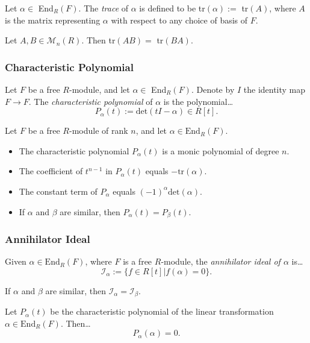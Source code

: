 \noindent Let $\alpha \in$ End$_R(F)$. The \emph{trace} of $\alpha$ is defined to be tr$(\alpha) :=$ tr$(A)$, where
$A$ is the matrix representing $\alpha$ with respect to any choice of basis of $F$.

\begin{lemma}
Let $A,B \in \mathcal{M}_n(R)$. Then tr$(AB) =$ tr$(BA)$.
\end{lemma}

\subsubsection{Characteristic Polynomial}\label{characteristicpolynomial}
Let $F$ be a free $R$-module, and let $\alpha \in$ End$_R(F)$. Denote by $I$ the identity map $F \rightarrow F$. The
\emph{characteristic polynomial} of $\alpha$ is the polynomial\dots
$$P_{\alpha}(t) := \textrm{det}(tI - \alpha) \in R[t].$$

\begin{proposition}
Let $F$ be a free $R$-module of rank $n$, and let $\alpha \in \textrm{End}_R(F)$.
\begin{itemize}
  \item The characteristic polynomial $P_{\alpha}(t)$ is a monic polynomial of degree $n$.
  \item The coefficient of $t^{n-1}$ in $P_{\alpha}(t)$ equals $-\textrm{tr}(\alpha)$.
  \item The constant term of $P_{\alpha}$ equals $(-1)^{\alpha}\textrm{det}(\alpha)$.
  \item If $\alpha$ and $\beta$ are similar, then $P_{\alpha}(t) = P_{\beta}(t)$.
\end{itemize}
\end{proposition}

\subsubsection{Annihilator Ideal}\label{annihilatorideal}
Given $\alpha \in \textrm{End}_R(F)$, where $F$ is a free $R$-module, the \emph{annihilator ideal of $\alpha$} is\dots
$$\mathcal{I}_{\alpha} := \{f \in R[t] | f(\alpha) = 0 \}.$$

\begin{lemma}
If $\alpha$ and $\beta$ are similar, then $\mathcal{I}_{\alpha} = \mathcal{I}_{\beta}$.
\end{lemma}

\begin{theorem}
Let $P_{\alpha}(t)$ be the characteristic polynomial of the linear transformation $\alpha \in \textrm{End}_{R}(F)$. Then\dots
$$P_{\alpha}(\alpha) = 0.$$
\end{theorem}


